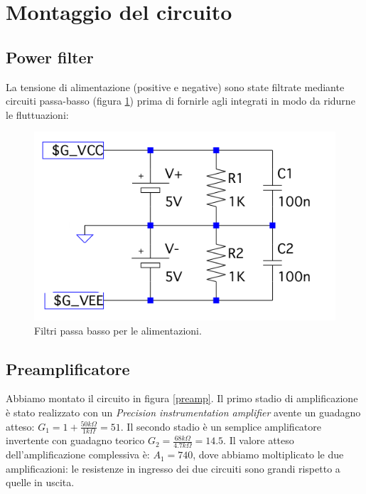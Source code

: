 \documentclass[10pt,a4paper]{article}
\begin{document}
\section{Montaggio del circuito}
\subsection{Power filter}
La tensione di alimentazione (positive e negative) sono state filtrate mediante circuiti passa-basso (figura \ref{power}) prima di fornirle agli integrati in modo da ridurne le fluttuazioni:

\begin{figure}[!htb]
\centering
\includegraphics[scale=0.5]{powerfilter.png}
\caption{Filtri passa basso per le alimentazioni.\label{power}}
\end{figure}


\subsection{Preamplificatore}
Abbiamo montato il circuito in figura \ref{preamp}.
Il primo stadio di amplificazione è stato realizzato con un \emph{Precision instrumentation amplifier} avente un guadagno atteso: $G_1 = 1+\frac{50 k\Omega}{1 k\Omega} = 51$. Il secondo stadio è un semplice amplificatore invertente con guadagno teorico $G_2 = \frac{68 k\Omega}{4.7 k\Omega} = 14.5$. Il valore atteso dell'amplificazione complessiva è: $A_1 = 740$, dove abbiamo moltiplicato le due amplificazioni: le resistenze in ingresso dei due circuiti sono grandi rispetto a quelle in uscita.

\end{document}
